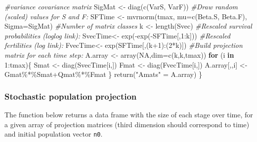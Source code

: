 \documentclass[
]{book}
\newenvironment{Shaded}{\begin{snugshade}}{\end{snugshade}}
\newcommand{\AttributeTok}[1]{\textcolor[rgb]{0.77,0.63,0.00}{#1}}
\newcommand{\CommentTok}[1]{\textcolor[rgb]{0.56,0.35,0.01}{\textit{#1}}}
\newcommand{\ConstantTok}[1]{\textcolor[rgb]{0.00,0.00,0.00}{#1}}
\newcommand{\ControlFlowTok}[1]{\textcolor[rgb]{0.13,0.29,0.53}{\textbf{#1}}}
\newcommand{\DecValTok}[1]{\textcolor[rgb]{0.00,0.00,0.81}{#1}}
\newcommand{\FunctionTok}[1]{\textcolor[rgb]{0.00,0.00,0.00}{#1}}
\newcommand{\NormalTok}[1]{#1}
\newcommand{\OtherTok}[1]{\textcolor[rgb]{0.56,0.35,0.01}{#1}}
\newcommand{\SpecialCharTok}[1]{\textcolor[rgb]{0.00,0.00,0.00}{#1}}
\newcommand{\StringTok}[1]{\textcolor[rgb]{0.31,0.60,0.02}{#1}}
\begin{document}
\begin{Shaded}
\begin{Highlighting}[]
  \CommentTok{\#variance covariance matrix }
\NormalTok{  SigMat }\OtherTok{\textless{}{-}} \FunctionTok{diag}\NormalTok{(}\FunctionTok{c}\NormalTok{(VarS, VarF))}
  \CommentTok{\#Draw random (scaled) values for S and F:}
\NormalTok{  SFTime }\OtherTok{\textless{}{-}} \FunctionTok{mvrnorm}\NormalTok{(tmax, }\AttributeTok{mu=}\FunctionTok{c}\NormalTok{(Beta.S, Beta.F), }\AttributeTok{Sigma=}\NormalTok{SigMat)}
  \CommentTok{\#Number of matrix classes }
\NormalTok{  k }\OtherTok{\textless{}{-}} \FunctionTok{length}\NormalTok{(Svec) }
  \CommentTok{\#Rescaled survival probabilities (loglog link):}
\NormalTok{  SvecTime}\OtherTok{\textless{}{-}}   \FunctionTok{exp}\NormalTok{(}\SpecialCharTok{{-}}\FunctionTok{exp}\NormalTok{(}\SpecialCharTok{{-}}\NormalTok{SFTime[,}\DecValTok{1}\SpecialCharTok{:}\NormalTok{k])) }
  \CommentTok{\#Rescaled fertilities  (log link):}
\NormalTok{  FvecTime}\OtherTok{\textless{}{-}} \FunctionTok{exp}\NormalTok{(SFTime[,(k}\SpecialCharTok{+}\DecValTok{1}\NormalTok{)}\SpecialCharTok{:}\NormalTok{(}\DecValTok{2}\SpecialCharTok{*}\NormalTok{k)]) }
\CommentTok{\#Build  projection matrix for each time step:}
\NormalTok{  A.array }\OtherTok{\textless{}{-}} \FunctionTok{array}\NormalTok{(}\ConstantTok{NA}\NormalTok{,}\AttributeTok{dim=}\FunctionTok{c}\NormalTok{(k,k,tmax))}
  \ControlFlowTok{for}\NormalTok{ (i }\ControlFlowTok{in} \DecValTok{1}\SpecialCharTok{:}\NormalTok{tmax)\{}
\NormalTok{    Smat }\OtherTok{\textless{}{-}} \FunctionTok{diag}\NormalTok{(SvecTime[i,])}
\NormalTok{    Fmat }\OtherTok{\textless{}{-}} \FunctionTok{diag}\NormalTok{(FvecTime[i,])}
\NormalTok{    A.array[,,i] }\OtherTok{\textless{}{-}}\NormalTok{   Gmat}\SpecialCharTok{\%*\%}\NormalTok{Smat}\SpecialCharTok{+}\NormalTok{Qmat}\SpecialCharTok{\%*\%}\NormalTok{Fmat}
\NormalTok{  \}}
\FunctionTok{return}\NormalTok{(}\StringTok{"Amats"} \OtherTok{=}\NormalTok{ A.array)}
\NormalTok{\}}
\end{Highlighting}
\end{Shaded}

\hypertarget{stochastic-population-projection}{%
\subsubsection{Stochastic population projection}\label{stochastic-population-projection}}

The function below returns a data frame with the size of each stage over time, for a given array of projection matrices (third dimension should correspond to time) and initial population vector \texttt{n0}.
\end{document}
